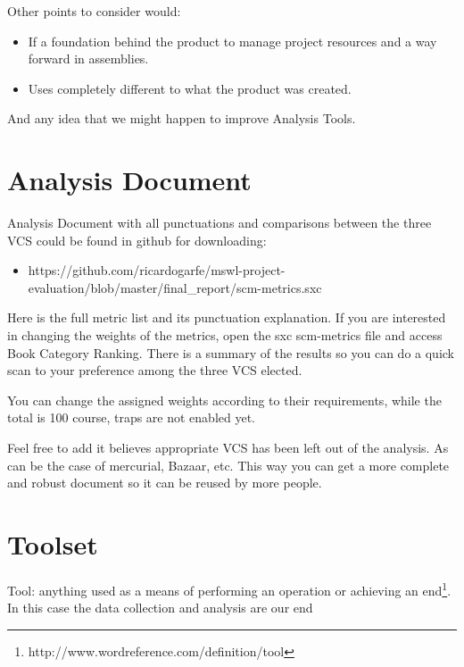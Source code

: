 \documentclass[11pt]{scrartcl}
\begin{document}
\par Other points to consider would:

\begin{itemize}
\item If a foundation behind the product to manage project resources and a way forward in assemblies.

\item Uses completely different to what the product was created.

\end{itemize}

And any idea that we might happen to improve Analysis Tools.

\section{Analysis Document}

Analysis Document with all punctuations and comparisons between the three VCS could be found in github for downloading:
\begin{itemize}
    \item https://github.com/ricardogarfe/mswl-project-evaluation/blob/master/final\_report/scm-metrics.sxc
\end{itemize}

\par Here is the full metric list and its punctuation explanation. If you are interested in changing the weights of the metrics, open the sxc scm-metrics file and access Book Category Ranking. There is a summary of the results so you can do a quick scan to your preference among the three VCS elected.

\par You can change the assigned weights according to their requirements, while the total is 100 course, traps are not enabled yet.

\par Feel free to add it believes appropriate VCS has been left out of the analysis. As can be the case of mercurial, Bazaar, etc. This way you can get a more complete and robust document so it can be reused by more people.

\section{Toolset}

\par Tool: anything used as a means of performing an operation or achieving an end\footnote{http://www.wordreference.com/definition/tool}. In this case the data collection and analysis are our end
\end{document}
